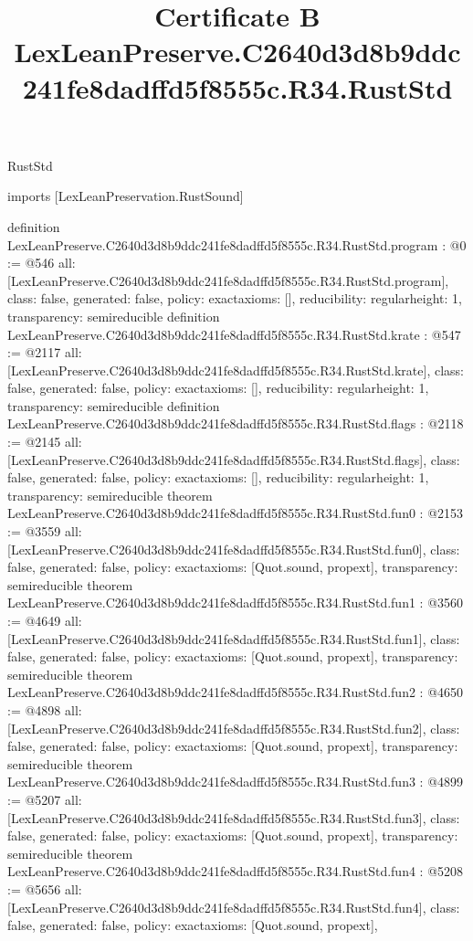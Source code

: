 \begin{lexlean}{RustStd}
\title{Certificate B LexLeanPreserve.C2640d3d8b9ddc241fe8dadffd5f8555c.R34.RustStd}
\begin{coremodule}
imports [LexLeanPreservation.RustSound]

definition LexLeanPreserve.C2640d3d8b9ddc241fe8dadffd5f8555c.R34.RustStd.program : @0 := @546 {
  all: [LexLeanPreserve.C2640d3d8b9ddc241fe8dadffd5f8555c.R34.RustStd.program],
  class: false,
  generated: false,
  policy: exact{axioms: []},
  reducibility: regular{height: 1},
  transparency: semireducible
}
definition LexLeanPreserve.C2640d3d8b9ddc241fe8dadffd5f8555c.R34.RustStd.krate : @547 := @2117 {
  all: [LexLeanPreserve.C2640d3d8b9ddc241fe8dadffd5f8555c.R34.RustStd.krate],
  class: false,
  generated: false,
  policy: exact{axioms: []},
  reducibility: regular{height: 1},
  transparency: semireducible
}
definition LexLeanPreserve.C2640d3d8b9ddc241fe8dadffd5f8555c.R34.RustStd.flags : @2118 := @2145 {
  all: [LexLeanPreserve.C2640d3d8b9ddc241fe8dadffd5f8555c.R34.RustStd.flags],
  class: false,
  generated: false,
  policy: exact{axioms: []},
  reducibility: regular{height: 1},
  transparency: semireducible
}
theorem LexLeanPreserve.C2640d3d8b9ddc241fe8dadffd5f8555c.R34.RustStd.fun0 : @2153 := @3559 {
  all: [LexLeanPreserve.C2640d3d8b9ddc241fe8dadffd5f8555c.R34.RustStd.fun0],
  class: false,
  generated: false,
  policy: exact{axioms: [Quot.sound, propext]},
  transparency: semireducible
}
theorem LexLeanPreserve.C2640d3d8b9ddc241fe8dadffd5f8555c.R34.RustStd.fun1 : @3560 := @4649 {
  all: [LexLeanPreserve.C2640d3d8b9ddc241fe8dadffd5f8555c.R34.RustStd.fun1],
  class: false,
  generated: false,
  policy: exact{axioms: [Quot.sound, propext]},
  transparency: semireducible
}
theorem LexLeanPreserve.C2640d3d8b9ddc241fe8dadffd5f8555c.R34.RustStd.fun2 : @4650 := @4898 {
  all: [LexLeanPreserve.C2640d3d8b9ddc241fe8dadffd5f8555c.R34.RustStd.fun2],
  class: false,
  generated: false,
  policy: exact{axioms: [Quot.sound, propext]},
  transparency: semireducible
}
theorem LexLeanPreserve.C2640d3d8b9ddc241fe8dadffd5f8555c.R34.RustStd.fun3 : @4899 := @5207 {
  all: [LexLeanPreserve.C2640d3d8b9ddc241fe8dadffd5f8555c.R34.RustStd.fun3],
  class: false,
  generated: false,
  policy: exact{axioms: [Quot.sound, propext]},
  transparency: semireducible
}
theorem LexLeanPreserve.C2640d3d8b9ddc241fe8dadffd5f8555c.R34.RustStd.fun4 : @5208 := @5656 {
  all: [LexLeanPreserve.C2640d3d8b9ddc241fe8dadffd5f8555c.R34.RustStd.fun4],
  class: false,
  generated: false,
  policy: exact{axioms: [Quot.sound, propext]},
}
\end{coremodule}
\end{lexlean}

